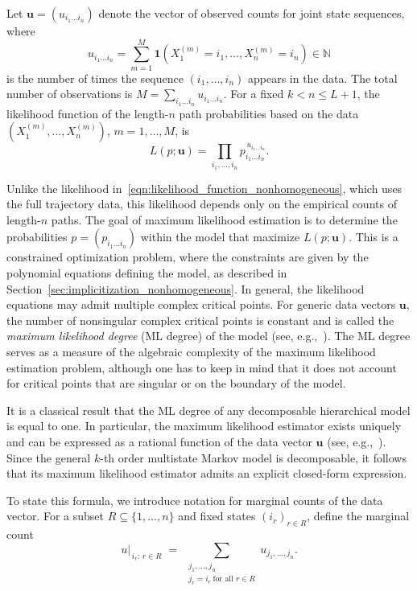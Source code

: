 \documentclass[11pt, a4paper]{article}
\numberwithin{equation}{section}
\theoremstyle{plain}
\theoremstyle{definition}
\renewcommand{\emph}[1]{\textit{#1}}
\begin{document}
Let $\mathbf{u}=(u_{i_1\ldots i_n})$ denote the vector of observed counts  for joint state sequences,
where
\[
u_{i_1\ldots i_n}
=
\sum_{m=1}^M \mathbf{1}\!\left(X_1^{(m)}=i_1,\ldots,X_n^{(m)}=i_n\right)
\in \mathbb{N}
\]
is the number of times the sequence $(i_1,\ldots,i_n)$ appears in the data.
The total number of observations is
$\textstyle{M=\sum_{i_1\ldots i_n} u_{i_1\ldots i_n}.}$
For a fixed $k<n\le L+1$, the likelihood function of the length-$n$ path probabilities
based on the data $(X_1^{(m)},\ldots,X_n^{(m)})$, $m=1,\ldots,M$, is
\[
L(p;\mathbf{u})
=
\prod_{i_1,\ldots,i_n} p_{i_1\ldots i_n}^{\,u_{i_1\ldots i_n}}.
\]

Unlike the likelihood in~\eqref{eqn:likelihood_function_nonhomogeneous}, which uses the full
trajectory data, this likelihood depends only on the empirical counts of length-$n$ paths.
The goal of maximum likelihood estimation is to determine the probabilities
$p=(p_{i_1\ldots i_n})$ within the model that maximize $L(p;\mathbf{u})$.
This is a constrained optimization problem, where the constraints
are given by the polynomial equations defining the model, as described in
Section~\ref{sec:implicitization_nonhomogeneous}. In general, the likelihood equations may admit
multiple complex critical points.
For generic data vectors $\mathbf{u}$, the number of nonsingular complex critical points is constant and is
called the \emph{maximum likelihood degree} (ML degree) of the model
(see, e.g.,~\cite[Chapter~6]{drton-sturmfels-sullivant}).
The ML degree serves as a measure of the algebraic complexity of the maximum likelihood estimation problem, although one has to keep in mind that it does not account for critical points that are singular or on the boundary of the model.






It is a classical result that the ML degree of any decomposable hierarchical model is equal to one.
In particular, the maximum likelihood estimator exists uniquely and can be expressed as a rational
function of the data vector $\mathbf{u}$
(see, e.g.,~\cite[Section~2.1.7]{drton-sturmfels-sullivant}).
Since the general $k$-th order multistate Markov model is decomposable,
it follows that its maximum likelihood estimator admits an explicit closed-form expression.

To state this formula, we introduce notation for marginal counts of the data vector.
For a subset $R \subseteq \{1,\ldots,n\}$ and fixed states $(i_r)_{r\in R}$, define the marginal count
\[
u\big|_{\,i_r:\, r\in R}
\;=\;
\sum_{\substack{j_1,\ldots,j_n\\ j_r=i_r\ \text{for all } r\in R}}
u_{j_1,\ldots,j_n}.
\]
\end{document}
